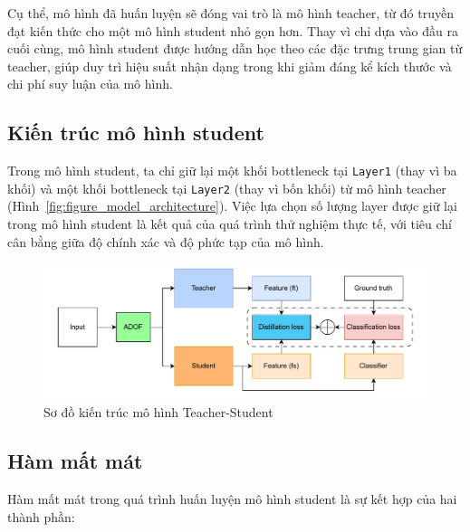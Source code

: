 Cụ thể, mô hình đã huấn luyện sẽ đóng vai trò là mô hình \gls{teacher}, từ đó truyền đạt kiến thức cho một mô hình \gls{student} nhỏ gọn hơn. Thay vì chỉ dựa vào đầu ra cuối cùng, mô hình \gls{student} được hướng dẫn học theo các đặc trưng trung gian từ \gls{teacher}, giúp duy trì hiệu suất nhận dạng trong khi giảm đáng kể kích thước và chi phí suy luận của mô hình.

\subsection{Kiến trúc mô hình \gls{student}}
%
%
Trong mô hình \gls{student}, ta chỉ giữ lại một khối \gls{bottleneck} tại \texttt{Layer1} (thay vì ba khối) và một khối \gls{bottleneck} tại \texttt{Layer2} (thay vì bốn khối) từ mô hình \gls{teacher} (Hình~\ref{fig:figure_model_architecture}).
%
Việc lựa chọn số lượng layer được giữ lại trong mô hình \gls{student} là kết quả của quá trình thử nghiệm thực tế, với tiêu chí cân bằng giữa độ chính xác và độ phức tạp của mô hình.
%
\begin{figure}[h!]
	\centering
	\includegraphics[width=1.0\linewidth]{Images/student_architechture.pdf}
	\begin{minipage}{1.0\linewidth}
		\vspace{5mm}
		\caption{Sơ đồ kiến trúc mô hình Teacher-Student}
		\label{fig:student_architecture}
	\end{minipage}
\end{figure}
%
\subsection{Hàm mất mát}

Hàm mất mát trong quá trình huấn luyện mô hình \gls{student} là sự kết hợp của hai thành phần:

